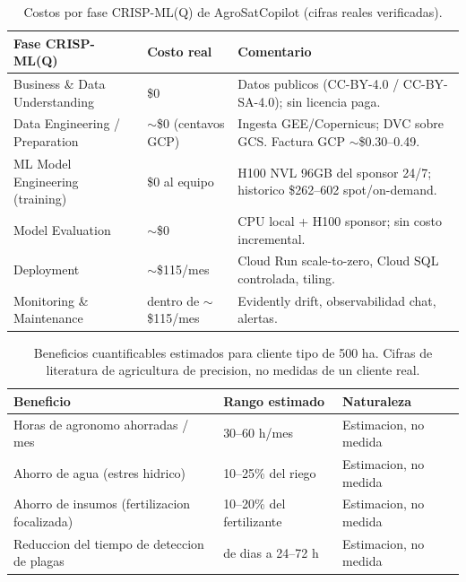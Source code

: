 
\begin{table}[ht]
  \centering
  \caption{Costos por fase CRISP-ML(Q) de AgroSatCopilot (cifras reales verificadas).}
  \label{tab:costos-crisp-mlq}
  \begin{tabularx}{\textwidth}{llX}
    \toprule
    \textbf{Fase CRISP-ML(Q)} & \textbf{Costo real} & \textbf{Comentario} \\
    \midrule
    Business \& Data Understanding & \$0 & Datos publicos (CC-BY-4.0 / CC-BY-SA-4.0); sin licencia paga. \\
    Data Engineering / Preparation & $\sim$\$0 (centavos GCP) & Ingesta GEE/Copernicus; DVC sobre GCS. Factura GCP $\sim$\$0.30--0.49. \\
    ML Model Engineering (training) & \$0 al equipo & H100 NVL 96GB del sponsor 24/7; historico \$262--602 spot/on-demand. \\
    Model Evaluation & $\sim$\$0 & CPU local + H100 sponsor; sin costo incremental. \\
    Deployment & $\sim$\$115/mes & Cloud Run scale-to-zero, Cloud SQL controlada, tiling. \\
    Monitoring \& Maintenance & dentro de $\sim$\$115/mes & Evidently drift, observabilidad chat, alertas. \\
    \bottomrule
  \end{tabularx}
\end{table}

\begin{table}[ht]
  \centering
  \caption{Beneficios cuantificables estimados para cliente tipo de 500 ha.
    Cifras de literatura de agricultura de precision, no medidas de un cliente real.}
  \label{tab:beneficios-500ha}
  \begin{tabularx}{\textwidth}{Xll}
    \toprule
    \textbf{Beneficio} & \textbf{Rango estimado} & \textbf{Naturaleza} \\
    \midrule
    Horas de agronomo ahorradas / mes & 30--60 h/mes & Estimacion, no medida \\
    Ahorro de agua (estres hidrico) & 10--25\% del riego & Estimacion, no medida \\
    Ahorro de insumos (fertilizacion focalizada) & 10--20\% del fertilizante & Estimacion, no medida \\
    Reduccion del tiempo de deteccion de plagas & de dias a 24--72 h & Estimacion, no medida \\
    \bottomrule
  \end{tabularx}
\end{table}
